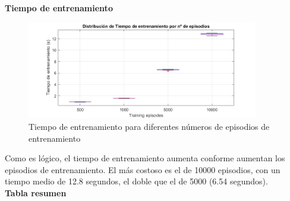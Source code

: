 \newpage

\textbf{Tiempo de entrenamiento}

\begin{figure}[H]
    \centering
    \includegraphics[width=0.9\textwidth]{../../experiments/qlearning/experiment-4/results/time.png}
    \caption{Tiempo de entrenamiento para diferentes números de episodios de entrenamiento}
    \label{fig:qlearning-time}
\end{figure}

Como es lógico, el tiempo de entrenamiento aumenta conforme aumentan los episodios de entrenamiento. El más costoso es el de 10000 episodios, con un tiempo medio de 12.8 segundos, el doble que el de 5000 (6.54 segundos).
\\

\textbf{Tabla resumen}

